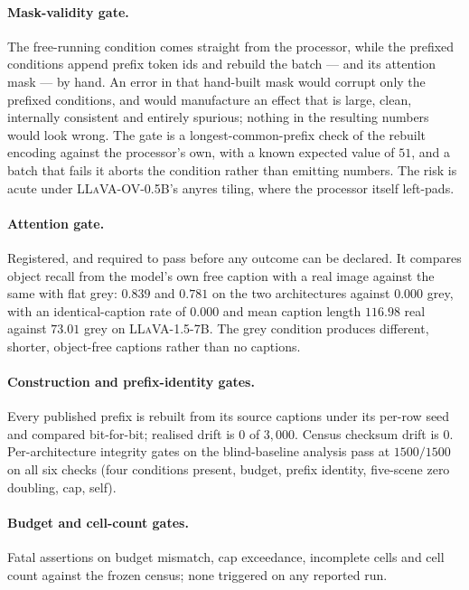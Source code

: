 \paragraph{Mask-validity gate.} The free-running condition comes straight from the processor, while
the prefixed conditions append prefix token ids and rebuild the batch --- and its attention mask ---
by hand. An error in that hand-built mask would corrupt only the prefixed conditions, and would
manufacture an effect that is large, clean, internally consistent and entirely spurious; nothing in
the resulting numbers would look wrong. The gate is a longest-common-prefix check of the rebuilt
encoding against the processor's own, with a known expected value of $51$, and a batch that fails it
aborts the condition rather than emitting numbers. The risk is acute under \textsc{LLaVA-OV-0.5B}'s
anyres tiling, where the processor itself left-pads.

\paragraph{Attention gate.} Registered, and required to pass before any outcome can be declared. It
compares object recall from the model's own free caption with a real image against the same with flat
grey: $0.839$ and $0.781$ on the two architectures against $0.000$ grey, with an identical-caption
rate of $0.000$ and mean caption length $116.98$ real against $73.01$ grey on \textsc{LLaVA-1.5-7B}.
The grey condition produces different, shorter, object-free captions rather than no captions.

\paragraph{Construction and prefix-identity gates.} Every published prefix is rebuilt from its source
captions under its per-row seed and compared bit-for-bit; realised drift is $0$ of $3{,}000$. Census
checksum drift is $0$. Per-architecture integrity gates on the blind-baseline analysis pass at $1500/1500$ on all
six checks (four conditions present, budget, prefix identity, five-scene zero doubling, cap, self).

\paragraph{Budget and cell-count gates.} Fatal assertions on budget mismatch, cap exceedance,
incomplete cells and cell count against the frozen census; none triggered on any reported run.

